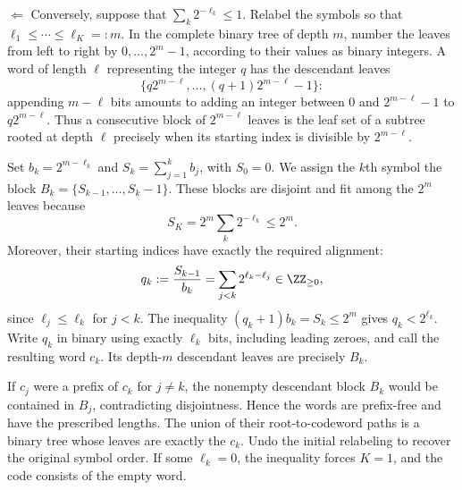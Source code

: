 
$\Leftarrow$ Conversely, suppose that $\sum_k2^{-\ell_k}\leq1$.
Relabel the symbols so that $\ell_1\leq\cdots\leq\ell_K=:m$.
In the complete binary tree of depth $m$, number the leaves from left to
right by $0,\ldots,2^m-1$, according to their values as binary integers.
A word of length $\ell$ representing the integer $q$ has the descendant
leaves
\[
 \{q2^{m-\ell},\ldots,(q+1)2^{m-\ell}-1\}:
\]
appending $m-\ell$ bits amounts to adding an integer between $0$ and
$2^{m-\ell}-1$ to $q2^{m-\ell}$. Thus a consecutive block of
$2^{m-\ell}$ leaves is the leaf set of a subtree rooted at depth $\ell$
precisely when its starting index is divisible by $2^{m-\ell}$.

Set $b_k=2^{m-\ell_k}$ and $S_k=\sum_{j=1}^k b_j$, with $S_0=0$.
We assign the $k$th symbol the block
$B_k=\{S_{k-1},\ldots,S_k-1\}$. These blocks are disjoint and fit among
the $2^m$ leaves because
\[
 S_K=2^m\sum_k2^{-\ell_k}\leq2^m.
\]
Moreover, their starting indices have exactly the required alignment:
\[
 q_k:=\frac{S_{k-1}}{b_k}
     =\sum_{j<k}2^{\ell_k-\ell_j}\in\ZZ_{\geq0},
\]
since $\ell_j\leq\ell_k$ for $j<k$. The inequality
$(q_k+1)b_k=S_k\leq2^m$ gives $q_k<2^{\ell_k}$. Write $q_k$ in binary
using exactly $\ell_k$ bits, including leading zeroes, and call the resulting
word $c_k$. Its depth-$m$ descendant leaves are precisely $B_k$.

If $c_j$ were a prefix of $c_k$ for $j\ne k$, the nonempty descendant block
$B_k$ would be contained in $B_j$, contradicting disjointness. Hence the
words are prefix-free and have the prescribed lengths. The union of their
root-to-codeword paths is a binary tree whose leaves are exactly the
$c_k$. Undo the initial relabeling to recover the original symbol order.
If some $\ell_k=0$, the inequality forces $K=1$, and the code consists of
the empty word.
